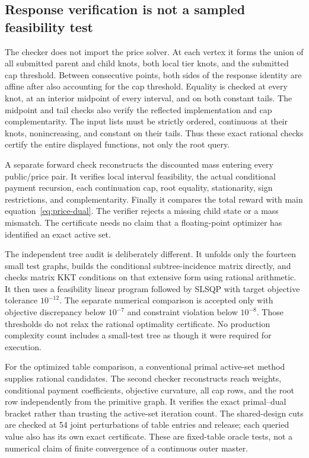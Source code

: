 \subsection{Response verification is not a sampled feasibility test}
The checker does not import the price solver. At each vertex it forms the union of all submitted parent and child knots, both local tier knots, and the submitted cap threshold. Between consecutive points, both sides of the response identity are affine after also accounting for the cap threshold. Equality is checked at every knot, at an interior midpoint of every interval, and on both constant tails. The midpoint and tail checks also verify the reflected implementation and cap complementarity. The input lists must be strictly ordered, continuous at their knots, nonincreasing, and constant on their tails. Thus these exact rational checks certify the entire displayed functions, not only the root query.

A separate forward check reconstructs the discounted mass entering every public/price pair. It verifies local interval feasibility, the actual conditional payment recursion, each continuation cap, root equality, stationarity, sign restrictions, and complementarity. Finally it compares the total reward with main equation~\eqref{eq:price-dual}. The verifier rejects a missing child state or a mass mismatch. The certificate needs no claim that a floating-point optimizer has identified an exact active set.

The independent tree audit is deliberately different. It unfolds only the fourteen small test graphs, builds the conditional subtree-incidence matrix directly, and checks matrix KKT conditions on that extensive form using rational arithmetic. It then uses a feasibility linear program followed by SLSQP with target objective tolerance $10^{-12}$. The separate numerical comparison is accepted only with objective discrepancy below $10^{-7}$ and constraint violation below $10^{-8}$. Those thresholds do not relax the rational optimality certificate. No production complexity count includes a small-test tree as though it were required for execution.

For the optimized table comparison, a conventional primal active-set method supplies rational candidates. The second checker reconstructs reach weights, conditional payment coefficients, objective curvature, all cap rows, and the root row independently from the primitive graph. It verifies the exact primal--dual bracket rather than trusting the active-set iteration count. The shared-design cuts are checked at 54 joint perturbations of table entries and release; each queried value also has its own exact certificate. These are fixed-table oracle tests, not a numerical claim of finite convergence of a continuous outer master.

